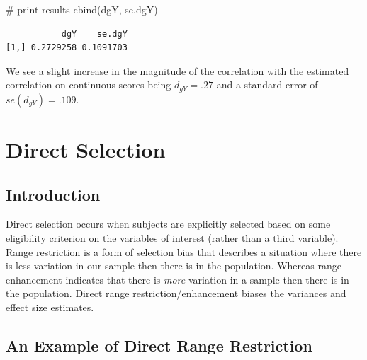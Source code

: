 \documentclass[
  letterpaper,
  DIV=11,
  numbers=noendperiod]{scrreprt}
\newenvironment{Shaded}{}{}
\newcommand{\CommentTok}[1]{\textcolor[rgb]{0.54,0.53,0.53}{#1}}
\newcommand{\FunctionTok}[1]{\textcolor[rgb]{0.39,0.29,0.61}{#1}}
\newcommand{\NormalTok}[1]{\textcolor[rgb]{0.12,0.11,0.11}{#1}}
\begin{document}
\begin{tcolorbox}
\begin{Shaded}
\begin{Highlighting}[]
\CommentTok{\# print results}
\FunctionTok{cbind}\NormalTok{(dgY, se.dgY)}
\end{Highlighting}
\end{Shaded}

\begin{verbatim}
           dgY    se.dgY
[1,] 0.2729258 0.1091703
\end{verbatim}

We see a slight increase in the magnitude of the correlation with the
estimated correlation on continuous scores being \(d_{gY}=.27\) and a
standard error of \(se(d_{gY})=.109\).

\end{tcolorbox}

\hypertarget{sec-direct_range_restriction}{%
\chapter{Direct Selection}\label{sec-direct_range_restriction}}

\hypertarget{introduction-5}{%
\section{Introduction}\label{introduction-5}}

Direct selection occurs when subjects are explicitly selected based on
some eligibility criterion on the variables of interest (rather than a
third variable). Range restriction is a form of selection bias that
describes a situation where there is less variation in our sample then
there is in the population. Whereas range enhancement indicates that
there is \emph{more} variation in a sample then there is in the
population. Direct range restriction/enhancement biases the variances
and effect size estimates.

\hypertarget{an-example-of-direct-range-restriction}{%
\section{An Example of Direct Range
Restriction}\label{an-example-of-direct-range-restriction}}
\end{document}
